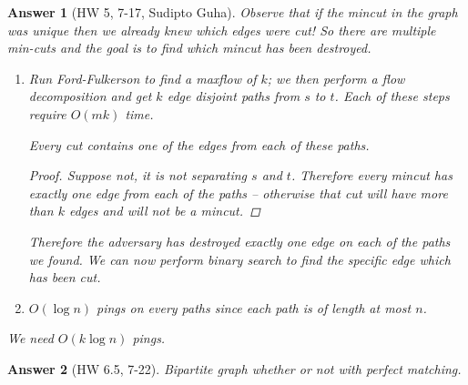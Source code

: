 \documentclass[11pt]{article}
\theoremstyle{numberplain}
\theoremstyle{nonumberplain}
\newtheorem{proof}{Proof}
\newtheorem{ans}{Answer}
\newcommand{\0}{{\mathbf{0}}}
\begin{document}
\begin{ans}[HW 5, 7-17, Sudipto Guha]
Observe that if the mincut in the graph was unique then we already knew which edges were cut! So there are multiple min-cuts and the goal is to find which mincut has been destroyed.

\begin{enumerate}
\item Run Ford-Fulkerson to find a maxflow of $k$; we then perform a flow decomposition and
get $k$ edge disjoint paths from $s$ to $t$. Each of these steps require $O(mk)$ time.
\begin{claim}
Every cut contains one of the edges from each of these paths.
\end{claim}
\begin{proof}
Suppose not, it is not separating
$s$ and $t$. Therefore every mincut has exactly one edge from each of the paths -- otherwise that cut
will have more than $k$ edges and will not be a mincut.
\end{proof}

Therefore the adversary has destroyed exactly one edge on each of the paths we found. We can
now perform binary search to find the specific edge which has been cut.
\item $O(\log n)$ pings on every paths since each path is of length at most $n$.
\end{enumerate}
We need $O(k \log n)$ pings.
\end{ans}

\begin{ans}[HW 6.5, 7-22] Bipartite graph whether or not with perfect matching.
\end{ans}
\end{document}
